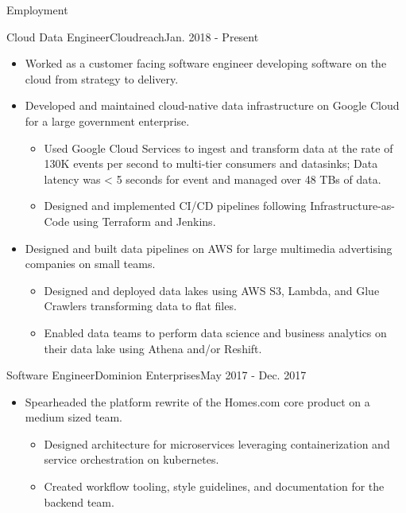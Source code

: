 \documentclass[]{mcdowellcv}
\begin{document}
    \makeheader

    \begin{cvsection}{Employment}


        \begin{cvsubsection}{Cloud Data Engineer}{Cloudreach}{Jan. 2018 - Present}
            \begin{itemize}
                \item Worked as a customer facing software engineer developing software on the cloud from strategy to delivery. 
                \item Developed and maintained cloud-native data infrastructure on Google Cloud for a large government enterprise.
                    \begin{itemize}
                            \item Used Google Cloud Services to ingest and transform data at the rate of 130K events per second to multi-tier consumers and datasinks; Data latency was < 5 seconds for event and managed over 48 TBs of data.
                            \item Designed and implemented CI/CD pipelines following Infrastructure-as-Code using Terraform and Jenkins.
                    \end{itemize}
                \end{itemize}
                \begin{itemize}
                    \item Designed and built data pipelines on AWS for large multimedia advertising companies on small teams.
                    \begin{itemize}
                        \item Designed and deployed data lakes using AWS S3, Lambda, and Glue Crawlers transforming data to flat files. 
                        \item Enabled data teams to perform data science and business analytics on their data lake using Athena and/or Reshift.
                    \end{itemize}
                \end{itemize}
        \end{cvsubsection}

        \begin{cvsubsection}{Software Engineer}{Dominion Enterprises}{May 2017 - Dec. 2017}
            \begin{itemize}
                \item Spearheaded the platform rewrite of the Homes.com core product on a medium sized team.
                \begin{itemize}
                    \item Designed architecture for microservices leveraging containerization and service orchestration on kubernetes. 
                    \item Created workflow tooling, style guidelines, and documentation for the backend team.
                \end{itemize}
            \end{itemize}
        \end{cvsubsection}


\end{cvsection}
\end{document}
